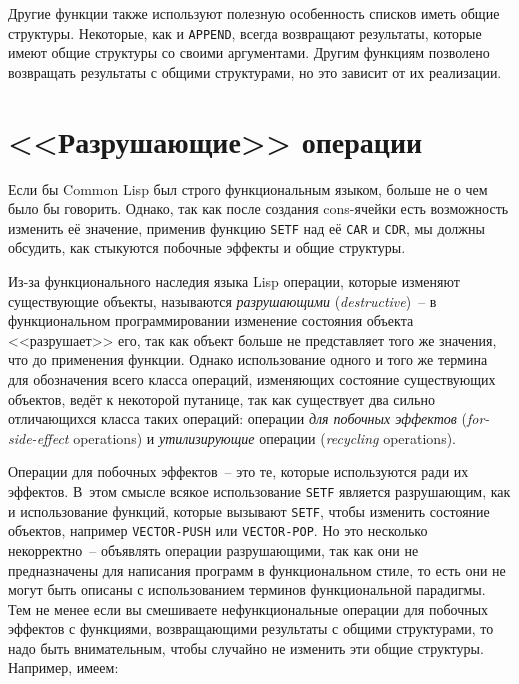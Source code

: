 Другие функции также используют полезную особенность списков иметь общие
структуры. Некоторые, как и \lstinline{APPEND}, всегда возвращают результаты, которые имеют
общие структуры со своими аргументами. Другим функциям позволено возвращать результаты с
общими структурами, но это зависит от их реализации.

\section{<<Разрушающие>> операции}

Если бы Common Lisp был строго функциональным языком, больше не о чем было бы
говорить. Однако, так как после создания cons-ячейки есть возможность изменить её значение,
применив функцию \lstinline{SETF} над её \lstinline{CAR} и \lstinline{CDR}, мы должны обсудить, как
стыкуются побочные эффекты и общие структуры.

Из-за функционального наследия языка Lisp операции, которые изменяют существующие объекты,
называются \textit{разрушающими} (\textit{destructive})~-- в функциональном программировании
изменение состояния объекта <<разрушает>> его, так как объект больше не представляет того же
значения, что до применения функции. Однако использование одного и того же термина для
обозначения всего класса операций, изменяющих состояние существующих объектов, ведёт к некоторой
путанице, так как существует два сильно отличающихся класса таких операций:
операции \textit{для побочных эффектов} (\textit{for-side-effect} operations) и
\textit{утилизирующие} операции (\textit{recycling} operations).

Операции для побочных эффектов~-- это те, которые используются ради их эффектов. В~этом
смысле всякое использование \lstinline{SETF} является разрушающим, как и использование
функций, которые вызывают \lstinline{SETF}, чтобы изменить состояние объектов, например
\lstinline{VECTOR-PUSH} или \lstinline{VECTOR-POP}. Но это несколько некорректно~-- объявлять операции
разрушающими, так как они не предназначены для написания программ в функциональном стиле,
то есть они не могут быть описаны с использованием терминов функциональной парадигмы. Тем не
менее если вы смешиваете нефункциональные операции для побочных эффектов с функциями,
возвращающими результаты с общими структурами, то надо быть внимательным, чтобы случайно
не изменить эти общие структуры. Например, имеем:

